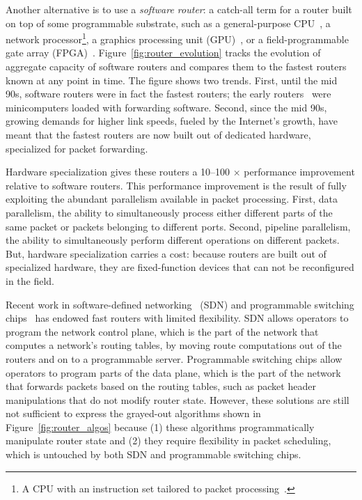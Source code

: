Another alternative is to use a \textit{software router}: a catch-all term for
a router built on top of some programmable substrate, such as a general-purpose
CPU~\cite{click, routebricks}, a network processor\footnote{A CPU with an
instruction set tailored to packet processing~\cite{ixp4xx, ixp2800}.}, a
graphics processing unit (GPU)~\cite{packetshader}, or a field-programmable
gate array (FPGA)~\cite{netfpga}.  Figure~\ref{fig:router_evolution} tracks the
evolution of aggregate capacity of software routers and compares them to the
fastest routers known at any point in time. The figure shows two trends.
First, until the mid 90s, software routers were in fact the fastest routers;
the early routers~\cite{imp} were minicomputers loaded with forwarding
software. Second, since the mid 90s, growing demands for higher link speeds,
fueled by the Internet's growth, have meant that the fastest routers are now
built out of dedicated hardware, specialized for packet forwarding.

Hardware specialization gives these routers a 10--100 $\times$ performance
improvement relative to software routers.  This performance improvement is the
result of fully exploiting the abundant parallelism available in packet
processing. First, data parallelism, the ability to simultaneously process
either different parts of the same packet or packets belonging to different
ports. Second, pipeline parallelism, the ability to simultaneously perform
different operations on different packets. But, hardware specialization carries
a cost: because routers are built out of specialized hardware, they are
fixed-function devices that can not be reconfigured in the field.

Recent work in software-defined networking~\cite{openflow} (SDN) and
programmable switching chips~\cite{rmt, xpliant, flexpipe} has endowed fast
routers with limited flexibility. SDN allows operators to program the network
control plane, which is the part of the network that computes a network's
routing tables, by moving route computations out of the routers and on to a
programmable server. Programmable switching chips allow operators to program
parts of the data plane, which is the part of the network that forwards packets
based on the routing tables, such as packet header manipulations that do not
modify router state.  However, these solutions are still not sufficient to
express the grayed-out algorithms shown in Figure~\ref{fig:router_algos}
because (1) these algorithms programmatically manipulate router state and (2)
they require flexibility in packet scheduling, which is untouched by both SDN
and programmable switching chips.

